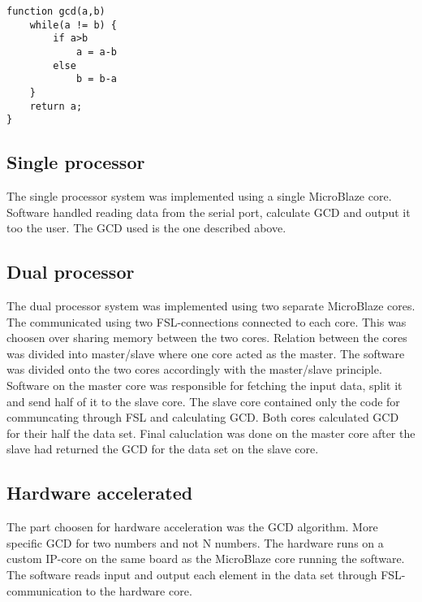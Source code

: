 \documentclass[11pt]{article}
\begin{document}
\begin{lstlisting}[float=tbh,frame=tb,captionpos=b,caption={Euclidean subtracion algorithm},label=lst:example]
function gcd(a,b)
	while(a != b) {
		if a>b
			a = a-b
		else
			b = b-a
	}
	return a;
}
\end{lstlisting}

\subsection{Single processor}
The single processor system was implemented using a single MicroBlaze core. Software handled reading data from the serial port, calculate GCD and output it too the user. The GCD used is the one described above.

\subsection{Dual processor}
The dual processor system was implemented using two separate MicroBlaze cores. The communicated using two FSL-connections connected to each core. This was choosen over sharing memory between the two cores. Relation between the cores was divided into master/slave where one core acted as the master. The software was divided onto the two cores accordingly with the master/slave principle. Software on the master core was responsible for fetching the input data, split it and send half of it to the slave core. The slave core contained only the code for communcating through FSL and calculating GCD. Both cores calculated GCD for their half the data set. Final caluclation was done on the master core after the slave had returned the GCD for the data set on the slave core.
\subsection{Hardware accelerated}
The part choosen for hardware acceleration was the GCD algorithm. More specific GCD for two numbers and not N numbers. The hardware runs on a custom IP-core on the same board as the MicroBlaze core running the software. The software reads input and output each element in the data set through FSL-communication to the hardware core.  

\end{document}
